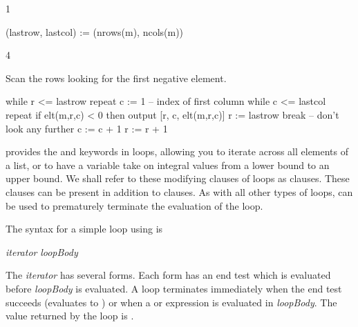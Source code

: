 {\begin{xtc}
\begin{TeXOutput}
\begin{fricasmath}{8}
1%
\end{fricasmath}
\end{TeXOutput}
\end{xtc}
\begin{xtc}
\begin{xtccomment}
\end{xtccomment}
\begin{spadsrc}
(lastrow, lastcol) := (nrows(m), ncols(m)) 
\end{spadsrc}
\begin{TeXOutput}
\begin{fricasmath}{9}
4%
\end{fricasmath}
\end{TeXOutput}
\end{xtc}
%
\begin{xtc}
\begin{xtccomment}
Scan the rows looking for the first negative element.
\end{xtccomment}
\begin{spadsrc}
while r <= lastrow repeat
  c := 1  -- index of first column
  while c <= lastcol repeat
    if elt(m,r,c) < 0 then
      output [r, c, elt(m,r,c)]
      r := lastrow
      break     -- don't look any further
    c := c + 1
  r := r + 1
\end{spadsrc}
\end{xtc}


\Language{} provides the 
and 
keywords in  loops,
allowing you to iterate across all
elements of a list, or to have a variable take on integral values
from a lower bound to an upper bound.
We shall refer to these modifying clauses of  loops as
 clauses.
These clauses can be present in addition to  clauses.
As with all other types of  loops,  can
be used to prematurely terminate the evaluation of the loop.

\beginImportant
The syntax for a simple loop using  is
\begin{center}
 {\it iterator}  {\it loopBody}
\end{center}
The {\it iterator} has several forms.
Each form has an end test which is evaluated
before {\it loopBody} is evaluated.
A  loop terminates immediately when the end test
succeeds (evaluates to ) or when a  or 
expression is evaluated in {\it loopBody}.
The value returned by the loop is \void{}.
\endImportant

}
